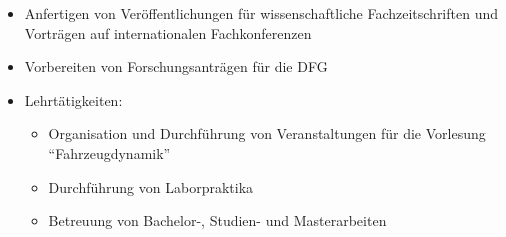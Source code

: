 \documentclass{mycv}
\begin{document}
\begin{paracol}{2}
\begin{itemize}
\begin{itemize}
					genauere Modellierung der Fluidstr{\"o}mungen
				\item Koordination von L{\"o}sungen im Falle von Codekonflikten 
				\item Bearbeitung und Verwaltung von Bugreports und Merge-Requests in
					\href{https://about.gitlab.com/}{}
			\end{itemize}
			\begin{itemize}
				\item Überwachung und Pflege des nächtlichen Pasimodo-Build-Systems nach
					den Prinzipien der Continuous Integration (CI)
				\item Pflege des verteilten {\bfseries C++} Kompilierungsystemes
					bassierend auf \href{https://github.com/distcc/distcc}{}
				\item Entwicklung und Pfege von Software Releases mithilfe des
					\href{https://nvie.com/posts/a-successful-git-branching-model/}{}
					Branching-Modells
			\end{itemize}
			\item Anfertigen von Ver{\"o}ffentlichungen f{\"u}r 
				wissenschaftliche Fachzeitschriften und Vortr{\"a}gen auf
				internationalen Fachkonferenzen
			\item Vorbereiten von Forschungsantr{\"a}gen f{\"u}r die DFG 
			\item Lehrt{\"a}tigkeiten:
				\begin{itemize}
					\item Organisation und Durchf{\"u}hrung von Veranstaltungen f{\"u}r
						die Vorlesung ``Fahrzeugdynamik''
					\item Durchf{\"u}hrung von Laborpraktika
					\item Betreuung von Bachelor-, Studien- und Masterarbeiten\\
				\end{itemize}
		\end{itemize}


\end{paracol}
\end{document}
